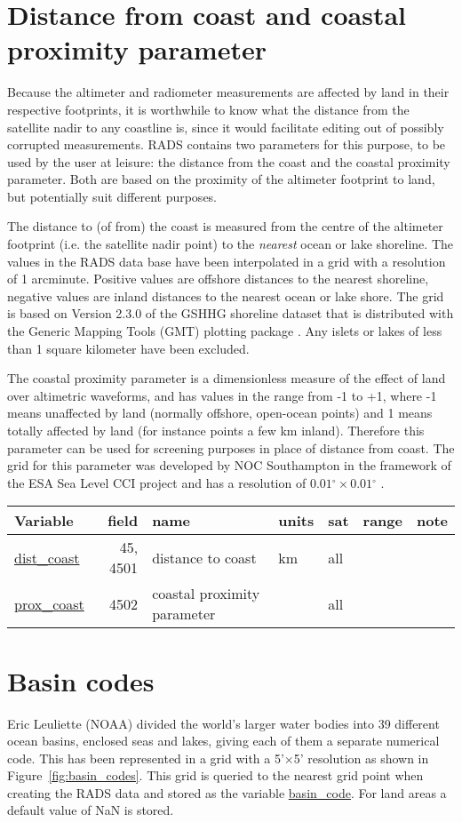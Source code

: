 \documentclass[a4paper,11pt,openany,natbib,nomargin]{thesis}
\makeatletter
\renewcommand\deg{\ensuremath{^\circ}}
\newcommand\var[1]{\url{#1}\index{variables!#1@\protect\url{#1}}}
\newenvironment{vartable}{
\begin{table}[ht]
\small
\begin{tabular}{lrllllr}
\hline
Variable & field & name & units & sat & range & note \\
\hline
}{
\hline
\end{tabular}
\end{table}
}
\makeatother
\begin{document}
\section{Distance from coast and coastal proximity parameter}

Because the altimeter and radiometer measurements are affected by land in their respective footprints, it is worthwhile to know what the distance from the satellite nadir to any coastline is, since it would facilitate editing out of possibly corrupted measurements. RADS contains two parameters for this purpose, to be used by the user at leisure: the distance from the coast and the coastal proximity parameter. Both are based on the proximity of the altimeter footprint to land, but potentially suit different purposes.

The distance to (of from) the coast is measured from the centre of the altimeter footprint (i.e. the satellite nadir point) to the \emph{nearest} ocean or lake shoreline. The values in the RADS data base have been interpolated in a grid with a resolution of 1 arc\-minute. Positive values are offshore distances to the nearest shoreline, negative values are inland distances to the nearest ocean or lake shore. The grid is based on Version 2.3.0 of the GSHHG shoreline dataset \citep{wessel1996} that is distributed with the Generic Mapping Tools (GMT) plotting package \citep{wessel2013}. Any islets or lakes of less than 1 square kilometer have been excluded.

The coastal proximity parameter is a dimensionless measure of the effect of land over altimetric waveforms, and has values in the range from -1 to +1, where -1 means unaffected by land (normally offshore, open-ocean points) and 1 means totally affected by land (for instance points a few km inland). Therefore this parameter can be used for screening purposes in place of distance from coast. The grid for this parameter was developed by NOC Southampton in the framework of the ESA Sea Level CCI project and has a resolution of $0.01\deg\times0.01\deg$ \citep{cipollini2011}.

\begin{vartable}
\var{dist_coast} & 45, 4501 & distance to coast & km & all && \\
\var{prox_coast} & 4502 & coastal proximity parameter && all && \\
\end{vartable}

\section{Basin codes}
Eric Leuliette (NOAA) divided the world's larger water bodies into 39 different ocean basins, enclosed seas and lakes, giving each of them a separate numerical code. This has been represented in a grid with a 5'$\times$5' resolution as shown in Figure~\ref{fig:basin_codes}. This grid is queried to the nearest grid point when creating the RADS data and stored as the variable \var{basin_code}. For land areas a default value of NaN is stored.
\end{document}
